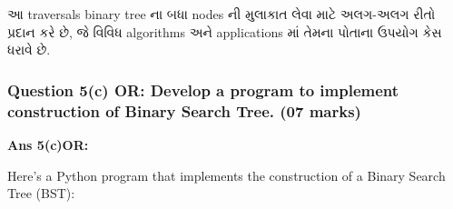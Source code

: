 આ traversals binary tree ના બધા nodes ની મુલાકાત લેવા માટે અલગ-અલગ રીતો
પ્રદાન કરે છે, જે વિવિધ algorithms અને applications માં તેમના પોતાના ઉપયોગ કેસ
ધરાવે છે.

\hypertarget{question-5c-or-develop-a-program-to-implement-construction-of-binary-search-tree.-07-marks}{%
\subsubsection{Question 5(c) OR: Develop a program to implement
construction of Binary Search Tree. (07
marks)}\label{question-5c-or-develop-a-program-to-implement-construction-of-binary-search-tree.-07-marks}}

\textbf{Ans 5(c)OR:}

Here's a Python program that implements the construction of a Binary
Search Tree (BST):

